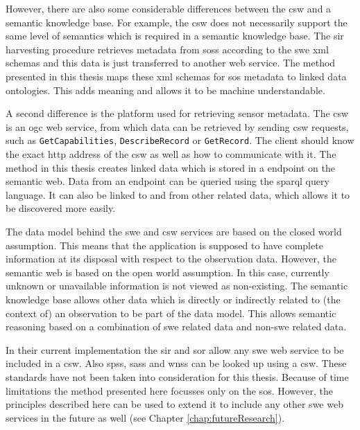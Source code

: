 However, there are also some considerable differences between the \ac{csw} and a semantic knowledge base. For example, the \ac{csw} does not necessarily support the same level of semantics which is required in a semantic knowledge base. The \ac{sir} harvesting procedure retrieves metadata from \aclp{sos} according to the \ac{swe} \ac{xml} schemas and this data is just transferred to another web service. The method presented in this thesis maps these \ac{xml} schemas for \ac{sos} metadata to linked data ontologies. This adds meaning and allows it to be machine understandable.

A second difference is the platform used for retrieving sensor metadata. The \ac{csw} is an \ac{ogc} web service, from which data can be retrieved by sending \ac{csw} requests, such as \texttt{GetCapabilities}, \texttt{DescribeRecord} or \texttt{GetRecord}. The client should know the exact \ac{http} address of the \ac{csw} as well as how to communicate with it. The method in this thesis creates linked data which is stored in a endpoint on the semantic web. Data from an endpoint can be queried using the \ac{sparql} query language. It can also be linked to and from other related data, which allows it to be discovered more easily.    

The data model behind the \ac{swe} and \ac{csw} services are based on the closed world assumption. This means that the application is supposed to have complete information at its disposal with respect to the observation data. However, the semantic web is based on the open world assumption. In this case, currently unknown or unavailable information is not viewed as non-existing. The semantic knowledge base allows other data which is directly or indirectly related to (the context of) an observation to be part of the data model. This allows semantic reasoning based on a combination of \ac{swe} related data and non-\ac{swe} related data.       

In their current implementation the \ac{sir} and \ac{sor} allow any \ac{swe} web service to be included in a \ac{csw}. Also \aclp{sps}, \aclp{sas} and \aclp{wns} can be looked up using a \ac{csw}. These standards have not been taken into consideration for this thesis. Because of time limitations the method presented here focusses only on the \ac{sos}. However, the principles described here can be used to extend it to include any other \ac{swe} web services in the future as well (see Chapter \ref{chap:futureResearch}).        

